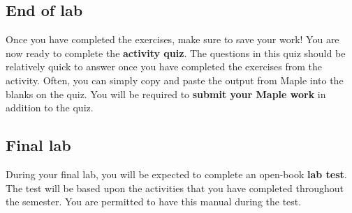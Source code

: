 
\subsection*{End of lab}
Once you have completed the exercises, make sure to save your work! You are now ready to complete the \textbf{activity quiz}. The questions in this quiz should be relatively quick to answer once you have completed the exercises from the activity. Often, you can simply copy and paste the output from Maple into the blanks on the quiz. You will be required to \textbf{submit your Maple work} in addition to the quiz.


\subsection*{Final lab}
During your final lab, you will be expected to complete an open-book \textbf{lab test}. The test will be based upon the activities that you have completed throughout the semester. You are permitted to have this manual during the test.



